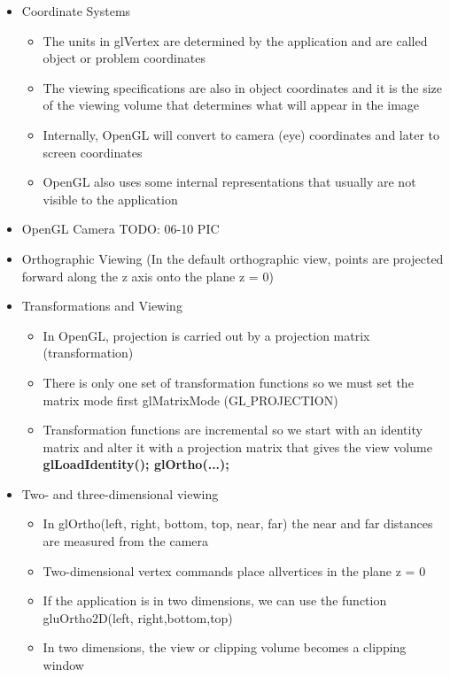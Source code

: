 \documentclass[11pt,a4paper]{article}
\begin{document}
\begin{itemize}
\begin{center}
			\end{center}
			\item Coordinate Systems
				\begin{itemize}
					\item The units in glVertex are determined by the application and are called object or problem coordinates	
					\item The viewing specifications are also in object	coordinates and it is the size of the viewing volume that determines what will appear in the image	
					\item Internally, OpenGL will convert to camera (eye) coordinates and later to screen coordinates 	
					\item OpenGL also uses some internal representations that usually are not visible to the application
				\end{itemize}
			\item OpenGL Camera TODO: 06-10 PIC
			\item Orthographic Viewing (In the default orthographic view, points are projected forward along the z axis onto the plane z = 0)
			\item Transformations and Viewing
				\begin{itemize}
					\item In OpenGL, projection is carried out by a projection matrix (transformation)	
					\item There is only one set of transformation functions so we must set the matrix mode first glMatrixMode (GL$\_$PROJECTION)	
					\item Transformation functions are incremental so we start with	an identity matrix and alter it with a projection matrix that gives the view volume \textbf{glLoadIdentity(); glOrtho(...);}
				\end{itemize}
			\item Two- and three-dimensional viewing
				\begin{itemize}
					\item In glOrtho(left, right, bottom, top, near, far) the near and far distances are measured from the camera	
					\item Two-dimensional vertex commands place allvertices in the plane z = 0	
					\item If the application is in two dimensions, we can use the function gluOrtho2D(left, right,bottom,top)	
					\item In two dimensions, the view or clipping volume becomes a clipping window
				\end{itemize}

\end{itemize}
\end{document}
